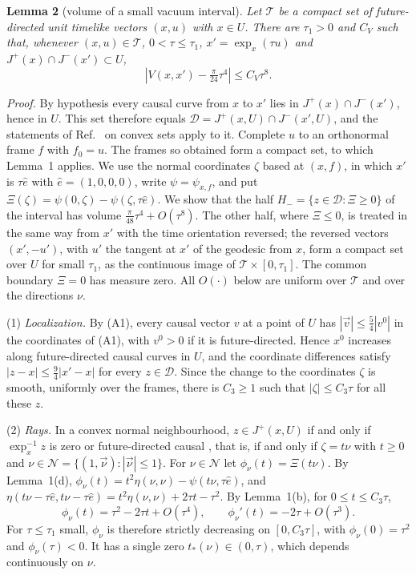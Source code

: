 \medskip
\noindent\textbf{Lemma 2} (volume of a small vacuum interval). \emph{Let
$\mathcal T$ be a compact set of future-directed unit timelike vectors
$(x,u)$ with $x\in U$. There are $\tau_1>0$ and $C_V$ such that, whenever
$(x,u)\in\mathcal T$, $0<\tau\le\tau_1$, $x'=\exp_x(\tau u)$ and
$J^+(x)\cap J^-(x')\subset U$,}
\begin{equation}
 \left|V(x,x')-\tfrac{\pi}{24}\tau^4\right|\le C_V\tau^8 .
 \label{conv:volume}
\end{equation}

\noindent\emph{Proof.} By hypothesis every causal curve from $x$ to $x'$
lies in $J^+(x)\cap J^-(x')$, hence in $U$. This set therefore equals
$\mathcal D=J^+(x,U)\cap J^-(x',U)$, and the statements of
Ref.~\cite{oneill} on convex sets apply to it. Complete $u$ to an
orthonormal frame $f$ with $f_0=u$. The frames so obtained form a compact
set, to which Lemma~1 applies. We use the normal coordinates $\zeta$ based
at $(x,f)$, in which $x'$ is $\tau\hat e$ with $\hat e=(1,0,0,0)$, write
$\psi=\psi_{x,f}$, and put $\Xi(\zeta)=\psi(0,\zeta)-\psi(\zeta,\tau\hat e)$.
We show that the half $H_-=\{z\in\mathcal D:\Xi\ge0\}$ of the interval has
volume $\tfrac{\pi}{48}\tau^4+O(\tau^8)$. The other half, where $\Xi\le0$,
is treated in the same way from $x'$ with the time orientation reversed;
the reversed vectors $(x',-u')$, with $u'$ the tangent at $x'$ of the
geodesic from $x$, form a compact set over $U$ for small $\tau_1$, as the
continuous image of $\mathcal T\times[0,\tau_1]$. The common boundary
$\Xi=0$ has measure zero. All $O(\cdot)$ below are uniform over $\mathcal T$
and over the directions $\nu$.

(1) \emph{Localization.} By (A1), every causal vector $v$ at a point of $U$
has $|\vec v|\le\tfrac54|v^0|$ in the coordinates of (A1), with $v^0>0$ if
it is future-directed. Hence $x^0$ increases along future-directed causal
curves in $U$, and the coordinate differences satisfy
$|z-x|\le\tfrac94|x'-x|$ for every $z\in\mathcal D$. Since the change to
the coordinates $\zeta$ is smooth, uniformly over the frames, there is
$C_3\ge1$ such that $|\zeta|\le C_3\tau$ for all these $z$.

(2) \emph{Rays.} In a convex normal neighbourhood, $z\in J^+(x,U)$ if and
only if $\exp_x^{-1}z$ is zero or future-directed causal
\cite[Lemma~14.2]{oneill}, that is, if and only if $\zeta=t\nu$ with
$t\ge0$ and $\nu\in\mathcal N=\{(1,\vec\nu):|\vec\nu|\le1\}$. For
$\nu\in\mathcal N$ let $\phi_\nu(t)=\Xi(t\nu)$. By Lemma~1(d),
$\phi_\nu(t)=t^2\eta(\nu,\nu)-\psi(t\nu,\tau\hat e)$, and
$\eta(t\nu-\tau\hat e,t\nu-\tau\hat e)=t^2\eta(\nu,\nu)+2\tau t-\tau^2$.
By Lemma~1(b), for $0\le t\le C_3\tau$,
\begin{equation}
 \phi_\nu(t)=\tau^2-2\tau t+O(\tau^4),\qquad
 \phi_\nu'(t)=-2\tau+O(\tau^3).
\end{equation}
For $\tau\le\tau_1$ small, $\phi_\nu$ is therefore strictly decreasing on
$[0,C_3\tau]$, with $\phi_\nu(0)=\tau^2$ and $\phi_\nu(\tau)<0$. It has a
single zero $t_*(\nu)\in(0,\tau)$, which depends continuously on $\nu$.

